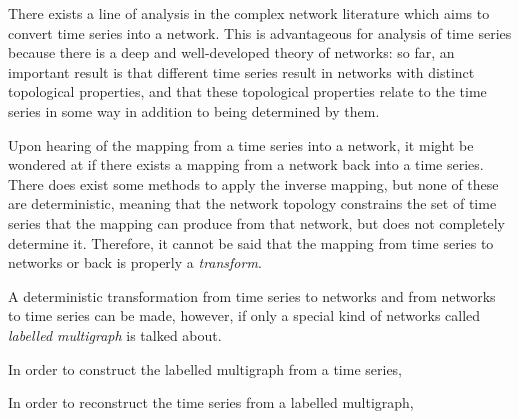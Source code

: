 \documentclass[12pt]{article}
\begin{document}
There exists a line of analysis in the complex network literature which aims to convert time series into a network. This is advantageous for analysis of time series because there is a deep and well-developed theory of networks: so far, an important result is that different time series result in networks with distinct topological properties, and that these topological properties relate to the time series in some way in addition to being determined by them. %


Upon hearing of the mapping from a time series into a network, it might be wondered at if there exists a mapping from a network back into a time series. There does exist some methods to apply the inverse mapping, but none of these are deterministic, meaning that the network topology constrains the set of time series that the mapping can produce from that network, but does not completely determine it. Therefore, it cannot be said that the mapping from time series to networks or back is properly a \emph{transform}.%

A deterministic transformation from time series to networks and from networks to time series can be made, however, if only a special kind of networks called \emph{labelled multigraph} is talked about. %

In order to construct the labelled multigraph from a time series,


In order to reconstruct the time series from a labelled multigraph,



%

%
%

\end{document}
